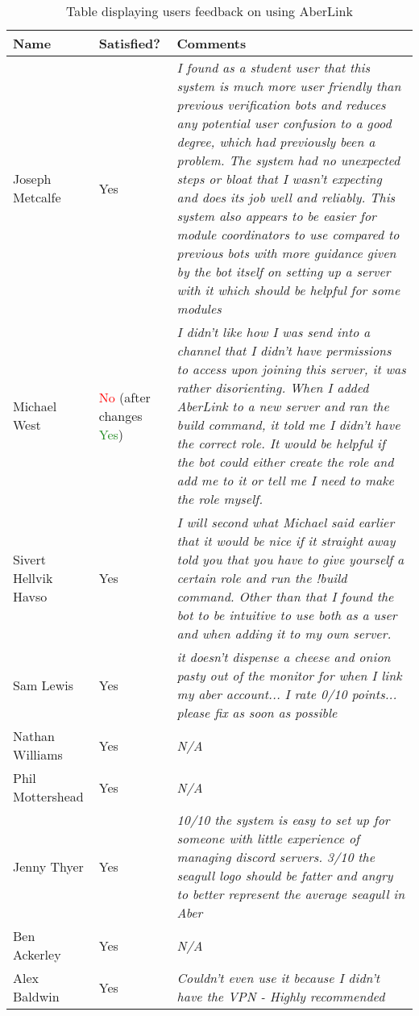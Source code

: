 \begin{table}[H]
    \centering
    \begin{tabular}{|p{2cm}|p{2cm}|p{10cm}|}
        \hline
        Name & Satisfied? & Comments \\
        \hline
        Joseph Metcalfe & \color{ForestGreen}Yes & \textit{I found as a student user that this system is much more user friendly than previous verification bots and reduces any potential user confusion to a good degree, which had previously been a problem. The system had no unexpected steps or bloat that I wasn't expecting and does its job well and reliably.  This system also appears to be easier for module coordinators to use compared to previous bots with more guidance given by the bot itself on setting up a server with it which should be helpful for some modules} \\
        \hline
        Michael West & \textcolor{red}{No} (after changes \textcolor{ForestGreen}{Yes}) & \textit{I didn't like how I was send into a channel that I didn't have permissions to access upon joining this server, it was rather disorienting. When I added AberLink to a new server and ran the build command, it told me I didn't have the correct role. It would be helpful if the bot could either create the role and add me to it or tell me I need to make the role myself.} \\
        \hline
        Sivert Hellvik Havso & \color{ForestGreen}Yes & \textit{I will second what Michael said earlier that it would be nice if it straight away told you that you have to give yourself a certain role and run the !build command. Other than that I found the bot to be intuitive to use both as a user and when adding it to my own server.} \\
        \hline
        Sam Lewis & \color{ForestGreen}Yes & \textit{it doesn't dispense a cheese and onion pasty out of the monitor for when I link my aber account... I rate 0/10 points... please fix as soon as possible} \\
        \hline
        Nathan Williams & \color{ForestGreen}Yes & \textit{N/A} \\
        \hline
        Phil Mottershead & \color{ForestGreen}Yes & \textit{N/A} \\
        \hline
        Jenny Thyer & \color{ForestGreen}Yes & \textit{10/10 the system is easy to set up for someone with little experience of managing discord servers. 3/10 the seagull logo should be fatter and angry to better represent the average seagull in Aber} \\
        \hline
        Ben Ackerley & \color{ForestGreen}Yes & \textit{N/A} \\
        \hline
        Alex Baldwin & \color{ForestGreen}Yes & \textit{Couldn't even use it because I didn't have the VPN - Highly recommended} \\
        \hline
    \end{tabular}
    \caption{Table displaying users feedback on using AberLink}
    \label{tab:service-response}
\end{table}

